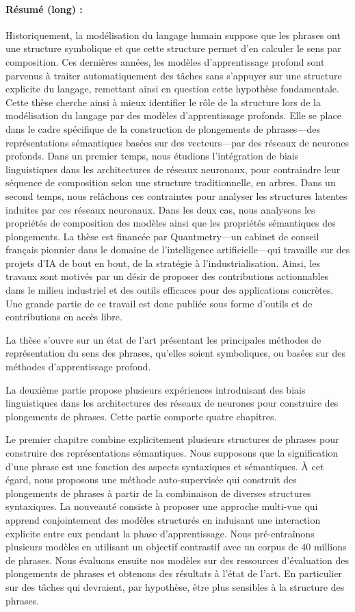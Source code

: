 \paragraph{Résumé (long) :} Historiquement, la modélisation du langage humain suppose que les phrases ont une structure symbolique et que cette structure permet d’en calculer le sens par composition. Ces dernières années, les modèles d’apprentissage profond sont parvenus à traiter automatiquement des tâches sans s’appuyer sur une structure explicite du langage, remettant ainsi en question cette hypothèse fondamentale. Cette thèse cherche ainsi à mieux identifier le rôle de la structure lors de la modélisation du langage par des modèles d’apprentissage profonds. Elle se place dans le cadre spécifique de la construction de plongements de phrases—des représentations sémantiques basées sur des vecteurs—par des réseaux de neurones profonds. Dans un premier temps, nous étudions l’intégration de biais linguistiques dans les architectures de réseaux neuronaux, pour contraindre leur séquence de composition selon une structure traditionnelle, en arbres. Dans un second temps, nous relâchons ces contraintes pour analyser les structures latentes induites par ces réseaux neuronaux. Dans les deux cas, nous analysons les propriétés de composition des modèles ainsi que les propriétés sémantiques des plongements. La thèse est financée par Quantmetry—un cabinet de conseil français pionnier dans le domaine de l'intelligence artificielle—qui travaille sur des projets d'IA de bout en bout, de la stratégie à l'industrialisation. Ainsi, les travaux sont motivés par un désir de proposer des contributions actionnables dans le milieu industriel et des outils efficaces pour des applications concrètes. Une grande partie de ce travail est donc publiée sous forme d’outils et de contributions en accès libre.

La thèse s’ouvre sur un état de l’art présentant les principales méthodes de représentation du sens des phrases, qu’elles soient symboliques, ou basées sur des méthodes d’apprentissage profond. 

La deuxième partie propose plusieurs expériences introduisant des biais linguistiques dans les architectures des réseaux de neurones pour construire des plongements de phrases. Cette partie comporte quatre chapitres.

Le premier chapitre combine explicitement plusieurs structures de phrases pour construire des représentations sémantiques. Nous supposons que la signification d'une phrase est une fonction des aspects syntaxiques et sémantiques. À cet égard, nous proposons une méthode auto-supervisée qui construit des plongements de phrases à partir de la combinaison de diverses structures syntaxiques. La nouveauté consiste à proposer une approche multi-vue qui apprend conjointement des modèles structurés en induisant une interaction explicite entre eux pendant la phase d'apprentissage. Nous pré-entraînons plusieurs modèles en utilisant un objectif contrastif avec un corpus de 40 millions de phrases. Nous évaluons ensuite nos modèles sur des ressources d’évaluation des plongements de phrases et obtenons des résultats à l’état de l’art. En particulier sur des tâches qui devraient, par hypothèse, être plus sensibles à la structure des phrases. 

